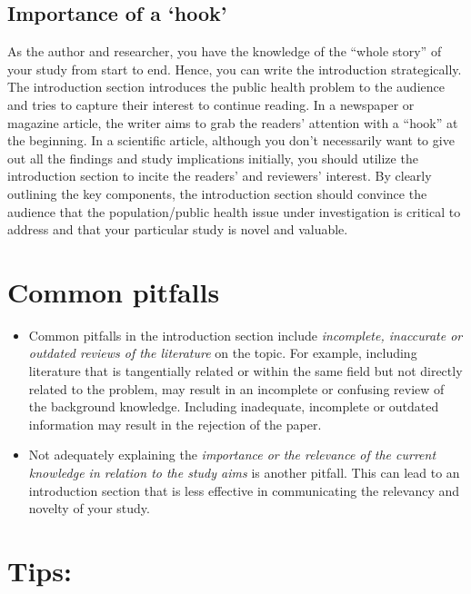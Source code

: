 \documentclass[
]{book}
\providecommand{\tightlist}{%
  \setlength{\itemsep}{0pt}\setlength{\parskip}{0pt}}
\begin{document}
\hypertarget{importance-of-a-hook}{%
\subsection{Importance of a `hook'}\label{importance-of-a-hook}}

As the author and researcher, you have the knowledge of the ``whole story'' of your study from start to end. Hence, you can write the introduction strategically. The introduction section introduces the public health problem to the audience and tries to capture their interest to continue reading. In a newspaper or magazine article, the writer aims to grab the readers' attention with a ``hook'' at the beginning. In a scientific article, although you don't necessarily want to give out all the findings and study implications initially, you should utilize the introduction section to incite the readers' and reviewers' interest. By clearly outlining the key components, the introduction section should convince the audience that the population/public health issue under investigation is critical to address and that your particular study is novel and valuable.

\hypertarget{common-pitfalls}{%
\section{Common pitfalls}\label{common-pitfalls}}

\begin{itemize}
\tightlist
\item
  Common pitfalls in the introduction section include \emph{incomplete, inaccurate or outdated reviews of the literature} on the topic. For example, including literature that is tangentially related or within the same field but not directly related to the problem, may result in an incomplete or confusing review of the background knowledge. Including inadequate, incomplete or outdated information may result in the rejection of the paper.
\item
  Not adequately explaining the \emph{importance or the relevance of the current knowledge in relation to the study aims} is another pitfall. This can lead to an introduction section that is less effective in communicating the relevancy and novelty of your study.
\end{itemize}

\hypertarget{tips}{%
\section{Tips:}\label{tips}}
\end{document}

